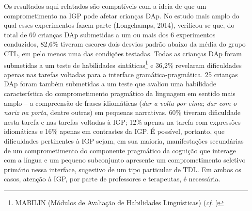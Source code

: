 \documentclass[output=paper,colorlinks,citecolor=brown,booklanguage=portuguese]{langscibook}
\begin{document}
Os resultados aqui relatados são compatíveis com a ideia de que um comprometimento na IGP pode afetar crianças DAp. No estudo mais amplo do qual esses experimentos fazem parte (Longchamps, 2014), verificou-se que, do total de 69 crianças DAp submetidas a um ou mais dos 6 experimentos conduzidos, 82,6\% tiveram escores dois desvios padrão abaixo da média do grupo CTL, em pelo menos uma das condições testadas. Todas as crianças DAp foram submetidas a um teste de habilidades sintáticas\footnote{MABILIN (Módulos de Avaliação de Habilidades Linguísticas) (\emph{cf}. )} e 36,2\% revelaram dificuldades apenas nas tarefas voltadas para a interface gramática-pragmática. 25 crianças DAp foram também submetidas a um teste que avaliou uma habilidade característica do comprometimento pragmático da linguagem em sentido mais amplo – a compreensão de frases idiomáticas (\emph{dar a volta por cima}; \emph{dar com o nariz na porta}, dentre outras) em pequenas narrativas. 60\% tiveram dificuldade nesta tarefa e nas tarefas voltadas à IGP; 12\% apenas na tarefa com expressões idiomáticas e 16\% apenas em contrastes da IGP. É possível, portanto, que dificuldades pertinentes à IGP sejam, em sua maioria, manifestações secundárias de um comprometimento do componente pragmático da cognição que interage com a língua e um pequeno subconjunto apresente um comprometimento seletivo primário nessa interface, sugestivo de um tipo particular de TDL. Em ambos os casos, atenção à IGP, por parte de professores e terapeutas, é necessária.
\end{document}
